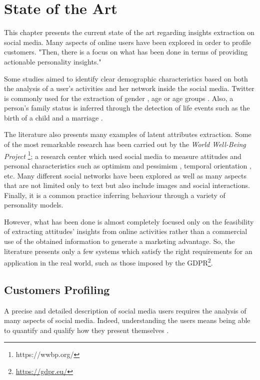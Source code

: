 \chapter{State of the Art}
\label{cha:SoA}
This chapter presents the current state of the art regarding insights extraction on social media.
Many aspects of online users have been explored in order to profile customers.
"Then, there is a focus on what has been done in terms of providing actionable personality insights."

Some studies aimed to identify clear demographic characteristics based on both the analysis of a user's activities and her network inside the social media. 
Twitter is commonly used for the extraction of gender \cite{miller2012gender}, age or age groups \cite{culotta2015predicting}.
Also, a person's family status is inferred through the detection of life events such as the birth of a child and a marriage \cite{dickinson2015identifying}.


The literature also presents many examples of latent attributes extraction.
Some of the most remarkable research has been carried out by the \emph{World Well-Being Project} \footnote{https://wwbp.org/}; a research center which used 
social media to measure attitudes and personal characteristics such as optimism and pessimism \cite{ruan2016finding}, temporal orientation \cite{schwartz2015extracting}, etc.
Many different social networks have been explored as well as many aspects that are not limited only to text but also include images and social interactions.
Finally, it is a common practice inferring behaviour through a variety of personality models.

However, what has been done is almost completely focused only on the feasibility of extracting attitudes' insights from online activities rather than a commercial use of the obtained information to generate a marketing advantage.
So, the literature presents only a few systems which satisfy the right requirements for an application in the real world, such as those imposed by the GDPR\footnote{\url{https://gdpr.eu/}}.

\section{Customers Profiling}
A precise and detailed description of social media users requires the analysis of many aspects of social media. 
Indeed, understanding the users means being able to quantify and qualify how they present themselves \cite{schwartz2013personality}.

